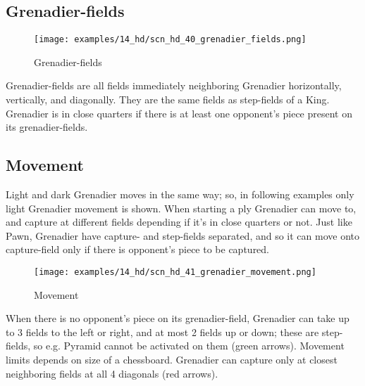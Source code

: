 
\vspace*{-0.3\baselineskip}
\subsection*{Grenadier-fields}
\label{sec:Hemera's Dawn/Grenadier/Grenadier-fields}

\vspace*{-0.7\baselineskip}
\noindent
\begin{wrapfigure}[9]{l}{0.4\textwidth}
\centering
\texttt{[image: examples/14\_hd/scn\_hd\_40\_grenadier\_fields.png]}
\vspace*{-0.5\baselineskip}
\caption{Grenadier-fields}
\label{fig:scn_hd_40_grenadier_fields}
\end{wrapfigure}
Grenadier-fields are all fields immediately neighboring Grenadier horizontally,
vertically, and diagonally. They are the same fields as step-fields of a King.\newline
\indent
Grenadier is in close quarters if there is at least one opponent's piece present
on its grenadier-fields.

\vspace*{-1.7\baselineskip}
\subsection*{Movement}
\label{sec:Hemera's Dawn/Grenadier/Movement}

\vspace*{-0.7\baselineskip}
Light and dark Grenadier moves in the same way; so, in following examples only
light Grenadier movement is shown.\newline
\indent
When starting a ply Grenadier can move to, and capture at different fields
depending if it's in close quarters or not.\newline
\indent
Just like Pawn, Grenadier have capture- and step-fields separated, and so it
can move onto capture-field only if there is opponent's piece to be captured.

\clearpage %

\vspace*{-1.7\baselineskip}
\noindent
\begin{wrapfigure}[9]{l}{0.4\textwidth}
\centering
\texttt{[image: examples/14\_hd/scn\_hd\_41\_grenadier\_movement.png]}
\vspace*{-0.5\baselineskip}
\caption{Movement}
\label{fig:scn_hd_41_grenadier_movement}
\end{wrapfigure}
When there is no opponent's piece on its grenadier-field, Grenadier can take up
to 3 fields to the left or right, and at most 2 fields up or down; these are
step-fields, so e.g. Pyramid cannot be activated on them (green arrows). Movement
limits depends on size of a chessboard.\newline
\indent
Grenadier can capture only at closest neighboring fields at all 4 diagonals (red
arrows).

